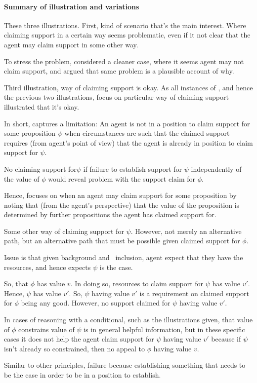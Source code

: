 \paragraph{Summary of illustration and variations}

\begin{note}
  These three illustrations.
  First, kind of scenario that's the main interest.
  Where claiming support in a certain way seems problematic, even if it not clear that the agent may claim support in some other way.

  To stress the problem, considered a cleaner case, where it seems agent may not claim support, and argued that same problem is a plausible account of why.

  Third illustration, way of claiming support is okay.
  As all instances of \nI{}, and hence the previous two illustrations, focus on particular way of claiming support illustrated that it's okay.
\end{note}

\begin{note}[Intuition]
  In short, \nI{} captures a limitation: An agent is not in a position to claim support for some proposition \(\psi\) when circumstances are such that the claimed support requires (from agent's point of view) that the agent is already in position to claim support for \(\psi\).

  No claiming support for\(\psi\) if failure to establish support for \(\psi\) independently of the value of \(\phi\) would reveal problem with the support claim for \(\phi\).

  Hence, \nI{} focuses on when an agent may claim support for some proposition by noting that (from the agent's perspective) that the value of the proposition is determined by further propositions the agent has claimed support for.

  Some other way of claiming support for \(\psi\).
  However, not merely an alternative path, but an alternative path that must be possible given claimed support for \(\phi\).

  Issue is that given {\color{red} background} and~{\color{red} inclusion}, agent expect that they have the resources, and hence expects \(\psi\) is the case.

  So, that \(\phi\) has value \(v\).
  In doing so, resources to claim support for \(\psi\) has value \(v'\).
  Hence, \(\psi\) has value \(v'\).
  So, \(\psi\) having value \(v'\) is a requirement on claimed support for \(\phi\) being any good.
  However, no support claimed for \(\psi\) having value \(v'\).

  In cases of reasoning with a conditional, such as the illustrations given, that value of \(\phi\) constrains value of \(\psi\) is in general helpful information, but in these specific cases it does not help the agent claim support for \(\psi\) having value \(v'\) because if \(\psi\) isn't already so constrained, then no appeal to \(\phi\) having value \(v\).

  Similar to other principles, failure because establishing something that needs to be the case in order to be in a position to establish.
\end{note}


